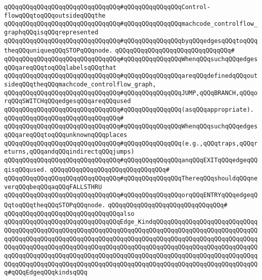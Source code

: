 \verb|qQQqqQQqqQQqqQQqqQQqqQQqqQQqqQQq#qQQqqQQqqQQqqQQqControl-flowqQQqtoqQQqoutsideqQQqthe|\newline
\verb|qQQqqQQqqQQqqQQqqQQqqQQqqQQqqQQq#qQQqqQQqqQQqqQQqmachcode_controlflow_graphqQQqisqQQqrepresented|\newline
\verb|qQQqqQQqqQQqqQQqqQQqqQQqqQQqqQQq#qQQqqQQqqQQqqQQqbyqQQqedgesqQQqtoqQQqtheqQQquniqueqQQqSTOPqQQqnode.|\newline
\verb|qQQqqQQqqQQqqQQqqQQqqQQqqQQqqQQq#|\newline
\verb|qQQqqQQqqQQqqQQqqQQqqQQqqQQqqQQq#qQQqqQQqqQQqqQQqWhenqQQqsuchqQQqedgesqQQqareqQQqtoqQQqlabelsqQQqthat|\newline
\verb|qQQqqQQqqQQqqQQqqQQqqQQqqQQqqQQq#qQQqqQQqqQQqqQQqareqQQqdefinedqQQqoutsideqQQqtheqQQqmachcode_controlflow_graph,|\newline
\verb|qQQqqQQqqQQqqQQqqQQqqQQqqQQqqQQq#qQQqqQQqqQQqqQQqJUMP,qQQqBRANCH,qQQqorqQQqSWITCHqQQqedgesqQQqareqQQqused|\newline
\verb|qQQqqQQqqQQqqQQqqQQqqQQqqQQqqQQq#qQQqqQQqqQQqqQQq(asqQQqappropriate).|\newline
\verb|qQQqqQQqqQQqqQQqqQQqqQQqqQQqqQQq#|\newline
\verb|qQQqqQQqqQQqqQQqqQQqqQQqqQQqqQQq#qQQqqQQqqQQqqQQqWhenqQQqsuchqQQqedgesqQQqareqQQqtoqQQqunknownqQQqplaces|\newline
\verb|qQQqqQQqqQQqqQQqqQQqqQQqqQQqqQQq#qQQqqQQqqQQqqQQq(e.g.,qQQqtraps,qQQqreturns,qQQqandqQQqindirectqQQqjumps)|\newline
\verb|qQQqqQQqqQQqqQQqqQQqqQQqqQQqqQQq#qQQqqQQqqQQqqQQqanqQQqEXITqQQqedgeqQQqisqQQqused.|\newline
\verb|qQQqqQQqqQQqqQQqqQQqqQQqqQQqqQQq#|\newline
\verb|qQQqqQQqqQQqqQQqqQQqqQQqqQQqqQQq#qQQqqQQqqQQqqQQqThereqQQqshouldqQQqneverqQQqbeqQQqaqQQqFALLSTHRU|\newline
\verb|qQQqqQQqqQQqqQQqqQQqqQQqqQQqqQQq#qQQqqQQqqQQqqQQqorqQQqENTRYqQQqedgeqQQqtoqQQqtheqQQqSTOPqQQqnode.|\newline
\verb|qQQqqQQqqQQqqQQqqQQqqQQqqQQqqQQq#|\newline
\verb|qQQqqQQqqQQqqQQqqQQqqQQqqQQqqQQqalso|\newline
\verb|qQQqqQQqqQQqqQQqqQQqqQQqqQQqqQQqEdge_KindqQQqqQQqqQQqqQQqqQQqqQQqqQQqqQQqqQQqqQQqqQQqqQQqqQQqqQQqqQQqqQQqqQQqqQQqqQQqqQQqqQQqqQQqqQQqqQQqqQQqqQQqqQQqqQQqqQQqqQQqqQQqqQQqqQQqqQQqqQQqqQQqqQQqqQQqqQQqqQQqqQQqqQQqqQQqqQQqqQQqqQQqqQQqqQQqqQQqqQQqqQQqqQQqqQQqqQQqqQQqqQQqqQQqqQQqqQQqqQQqqQQqqQQqqQQqqQQqqQQqqQQqqQQqqQQqqQQqqQQqqQQqqQQqqQQqqQQqqQQqqQQqqQQqqQQqqQQqqQQqqQQqqQQqqQQqqQQqqQQqqQQqqQQqqQQqqQQqqQQqqQQqqQQqqQQqqQQqqQQq#qQQqEdgeqQQqkindsqQQq|\newline

